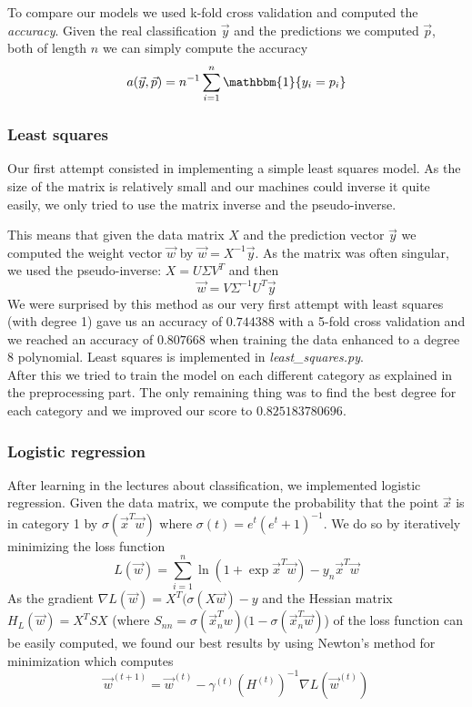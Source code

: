 \documentclass[10pt,conference,compsocconf]{IEEEtran}
\begin{document}
To compare our models we used k-fold cross validation and computed the \textit{accuracy}. Given the real classification $\vec{y}$ and the predictions we computed $\vec{p}$, both of length $n$ we can simply compute the accuracy $$a(\vec{y}, \vec{p}) = n^{-1}\sum_{i=1}^n \mathbbm{1}\{y_i = p_i\}$$

\subsubsection{Least squares}
Our first attempt consisted in implementing a simple least squares model. As the size of the matrix is relatively small and our machines could inverse it quite easily, we only tried to use the matrix inverse and the pseudo-inverse.

This means that given the data matrix $X$ and the prediction vector $\vec{y}$ we computed the weight vector $\vec{w}$ by
$\vec{w} = X^{-1} \vec{y}$. As the matrix was often singular, we used the pseudo-inverse: $X = U \Sigma V^T$ and then
$$\vec{w} = V \Sigma^{-1} U^T \vec{y}$$
We were surprised by this method as our very first attempt with least squares (with degree 1) gave us an accuracy of $0.744388$ with a 5-fold cross validation and we reached an accuracy of $0.807668$ when training the data enhanced to a degree 8 polynomial.
Least squares is implemented in \textit{least\_squares.py}.\\
After this we tried to train the model on each different category as explained in the preprocessing part. The only remaining thing was to find the best degree for each category and we improved our score to $0.825183780696$.

\subsubsection{Logistic regression} After learning in the lectures about classification, we implemented logistic regression. Given the data matrix, we compute the probability that the point $\vec{x}$ is in category 1 by $\sigma(\vec{x}^T\vec{w})$ where $\sigma(t) = e^t (e^t + 1)^{-1}$. We do so by iteratively minimizing the loss function
$$L(\vec{w}) = \sum^n_{i=1} \ln(1 + \exp{\vec{x}^T \vec{w}}) - y_n \vec{x}^T\vec{w}$$
As the gradient $\nabla L(\vec{w}) = X^T(\sigma(X\vec{w}) - y$ and the Hessian matrix $H_{L}(\vec{w}) = X^TSX$  (where $S_{nn} = \sigma(\vec{x}_n^T w)(1 - \sigma(\vec{x}_n^T\vec{w})$) of the loss function can be easily computed, we found our best results by using Newton's method for minimization which computes $$\vec{w}^{(t+1)} = \vec{w}^{(t)} - \gamma^{(t)} \left(H^{(t)}\right)^{-1}\nabla L\left(\vec{w}^{(t)}\right)$$
\end{document}
